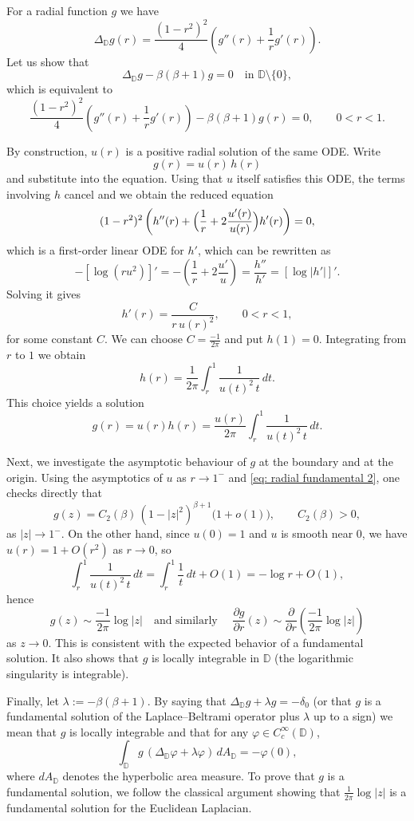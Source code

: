 \documentclass{article}
\begin{document}
For a radial function $g$ we have
\[
\Delta_{\mathbb{D}} g(r)
= \frac{(1-r^2)^2}{4}\left(g''(r)+\frac{1}{r}g'(r)\right).
\]
Let us show
that
\[
\Delta_{\mathbb{D}} g - \beta(\beta+1)g = 0 \quad\text{in }\mathbb{D}\setminus\{0\},
\]
which is equivalent to
\[
\frac{(1-r^2)^2}{4}\left(g''(r)+\frac{1}{r}g'(r)\right)
- \beta(\beta+1)g(r)=0,\qquad 0<r<1.
\]

By construction, $u(r)$ is a positive radial solution of the same ODE. Write
\[
g(r)=u(r)\,h(r)
\]
and substitute into the equation. Using that $u$ itself satisfies this ODE, the
terms involving $h$ cancel and we obtain the reduced equation
\[
(1-r^2)^2\left(h''(r)+\Bigl(\frac{1}{r}+2\frac{u'(r)}{u(r)}\Bigr)h'(r)\right)=0,
\]
which is a first-order linear ODE for $h'$, which can be rewritten as
\[
-\left[\log(ru^2) \right]'=-\left(\frac{1}{r}+2\frac{u'}{u}\right)
=\frac{h''}{h'}=\left[\log |h'|\right]'.
\]
Solving it gives
\[
h'(r)=\frac{C}{r\,u(r)^2},\qquad 0<r<1,
\]
for some constant $C$. We can choose $C=\frac{-1}{2\pi}$ and put $h(1)=0$. Integrating from $r$ to $1$ we obtain
\[
h(r)=\frac{1}{2\pi} \int_r^1\frac{1}{u(t)^2\,t}\,dt.
\]
This choice yields a solution
\[
g(r)=u(r)h(r)=\frac{u(r)}{2\pi}\int_r^1\frac{1}{u(t)^2\,t}\,dt.
\]


Next, we investigate the asymptotic behaviour of $g$ at the boundary and at the
origin. Using the asymptotics of $u$ as $r\to1^-$ and
\eqref{eq: radial fundamental 2}, one checks directly that
\[
g(z)
= C_2(\beta)\,(1 - |z|^2)^{\beta+1}\bigl(1+o(1)\bigr), \qquad C_2(\beta) >0,
\]
as $|z|\to 1^-$. On the other hand, since $u(0)=1$ and $u$ is smooth near $0$,
we have $u(r)=1+O(r^2)$ as $r\to0$, so
\[
\int_r^1\frac{1}{u(t)^2\,t}\,dt
= \int_r^1\frac{1}{t}\,dt + O(1)
= -\log r + O(1),
\]
 hence
\[
g(z)\sim \frac{-1}{2\pi}\log|z|\quad\text{and similarly }\quad
\frac{\partial g}{\partial r}(z)\sim \frac{\partial}{\partial r}
\left(\frac{-1}{2\pi}\log|z|\right)
\]
as $z\to 0$. This is consistent with the expected behavior of a fundamental
solution. It also shows that $g$ is locally integrable in $\mathbb{D}$ (the
logarithmic singularity is integrable).

Finally, let $\lambda:=-\beta(\beta+1)$.
By saying that $\Delta_{\mathbb{D}} g + \lambda g = -\delta_0$ (or that $g$ is a fundamental solution of the Laplace--Beltrami operator plus $\lambda$ up to a sign) we mean that $g$ is locally integrable and that for any $\varphi\in C_c^\infty(\mathbb{D})$,
\begin{equation} \label{eq:distributions}
\int_{\mathbb{D}} g\,(\Delta_{\mathbb{D}}\varphi+\lambda\varphi)\,dA_{\mathbb{D}}
= -\varphi(0),
\end{equation}
where $dA_{\mathbb{D}}$ denotes the hyperbolic area measure.
To prove that $g$ is a fundamental solution, we follow the classical argument showing that
$\frac{1}{2\pi}\log|z|$ is a fundamental solution for the Euclidean Laplacian.
\end{document}
